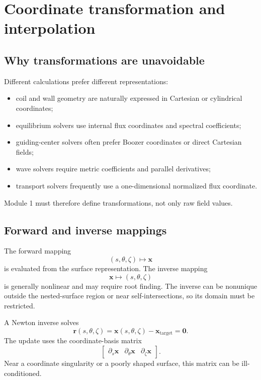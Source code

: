 \section{Coordinate transformation and interpolation}
\label{sec:transform_interpolation}

\subsection{Why transformations are unavoidable}
Different calculations prefer different representations:
\begin{itemize}[leftmargin=1.6em]
\item coil and wall geometry are naturally expressed in Cartesian or cylindrical coordinates;
\item equilibrium solvers use internal flux coordinates and spectral coefficients;
\item guiding-center solvers often prefer Boozer coordinates or direct Cartesian fields;
\item wave solvers require metric coefficients and parallel derivatives;
\item transport solvers frequently use a one-dimensional normalized flux coordinate.
\end{itemize}
Module 1 must therefore define transformations, not only raw field values.

\subsection{Forward and inverse mappings}
The forward mapping
\begin{equation}
(s,\theta,\zeta)\mapsto\mathbf x
\end{equation}
is evaluated from the surface representation. The inverse mapping
\begin{equation}
\mathbf x\mapsto(s,\theta,\zeta)
\end{equation}
is generally nonlinear and may require root finding. The inverse can be nonunique outside the nested-surface region or near self-intersections, so its domain must be restricted.

A Newton inverse solves
\begin{equation}
\mathbf r(s,\theta,\zeta)
=\mathbf x(s,\theta,\zeta)-\mathbf x_{\mathrm{target}}
=\mathbf 0.
\end{equation}
The update uses the coordinate-basis matrix
\begin{equation}
\begin{bmatrix}
\partial_s\mathbf x & \partial_\theta\mathbf x & \partial_\zeta\mathbf x
\end{bmatrix}.
\end{equation}
Near a coordinate singularity or a poorly shaped surface, this matrix can be ill-conditioned.

